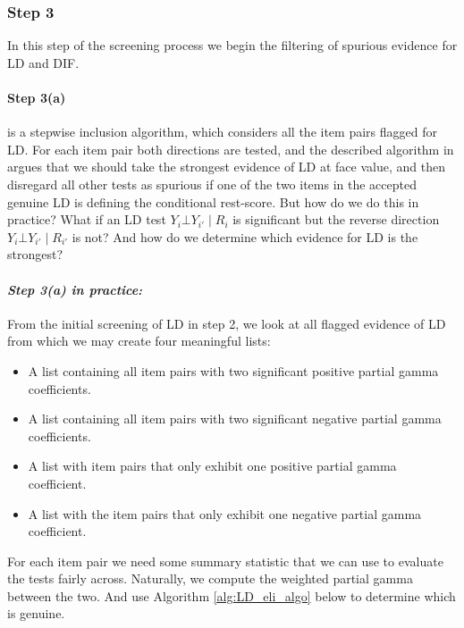 \documentclass[a4project,12pt]{article}
\theoremstyle{examplestyle}
\theoremstyle{defstyle}
\theoremstyle{thmstyle}
\begin{document}
\subsubsection{Step 3}
In this step of the screening process we begin the filtering of spurious evidence for LD and DIF. 

\paragraph{Step 3(a)} is a stepwise inclusion algorithm, which considers all the item pairs flagged for LD. For each item pair both directions are tested, and the described algorithm in \cite{Kreiner_Christensen_2011} argues that we should take the strongest evidence of LD at face value, and then disregard all other tests as spurious if one of the two items in the accepted genuine LD is defining the conditional rest-score. But how do we do this in practice? What if an LD test $Y_i \bot Y_{i'} \mid R_i$ is significant but the reverse direction $Y_i \bot Y_{i'} \mid R_{i'}$ is not? And how do we determine which evidence for LD is the strongest?

\paragraph{\textit{Step 3(a) in practice:}} From the initial screening of LD in step 2, we look at all flagged evidence of LD from which we may create four meaningful lists:
\begin{itemize}
    \item A list containing all item pairs with two significant positive partial gamma coefficients.
    \item A list containing all item pairs with two significant negative partial gamma coefficients.
    \item A list with item pairs that only exhibit one positive partial gamma coefficient.
    \item A list with the item pairs that only exhibit one negative partial gamma coefficient. 
\end{itemize}
For each item pair we need some summary statistic that we can use to evaluate the tests fairly across. Naturally, we compute the weighted partial gamma between the two. And use Algorithm \ref{alg:LD_eli_algo} below to determine which is genuine.
\end{document}
